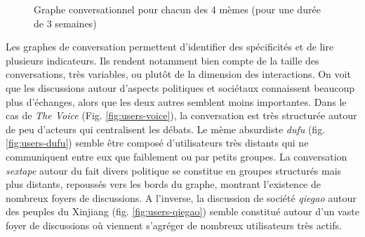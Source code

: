 \begin{figure}
{    }
    
  \caption{  
    Graphe conversationnel pour chacun des 4 m\`emes (pour une dur\'ee de 3 semaines)
  }
\end{figure}
\clearpage
Les graphes de conversation permettent d{\textquoteright}identifier des
sp\'ecificit\'es et de lire plusieurs indicateurs. Ils rendent
notamment bien compte de la taille des conversations, tr\`es variables,
ou plut\^ot de la dimension des interactions. On voit que les
discussions autour d{\textquoteright}aspects politiques et soci\'etaux
connaissent beaucoup plus d{\textquoteright}\'echanges, alors que les
deux autres semblent moins importantes. Dans le cas de \textit{The
Voice} (Fig. \ref{fig:users-voice}), la conversation est tr\`es structur\'ee autour de
peu d{\textquoteright}acteurs qui centralisent les d\'ebats. Le m\`eme
absurdiste \textit{dufu} (fig. \ref{fig:users-dufu}) semble \^etre compos\'e
d{\textquoteright}utilisateurs tr\`es distants qui ne communiquent
entre eux que faiblement ou par petits groupes. La conversation
\textit{sextape }autour du fait divers politique se constitue en
groupes structur\'es mais plus distants, repouss\'es vers les bords du
graphe, montrant l{\textquoteright}existence de nombreux foyers de
discussions. A l{\textquoteright}inverse, la discussion de soci\'et\'e
\textit{qiegao}\textit{ }autour des peuples du Xinjiang (fig. \ref{fig:users-qiegao})
semble constitu\'e autour d{\textquoteright}un vaste foyer de
discussions o\`u viennent s{\textquoteright}agr\'eger de nombreux
utilisateurs tr\`es actifs.

